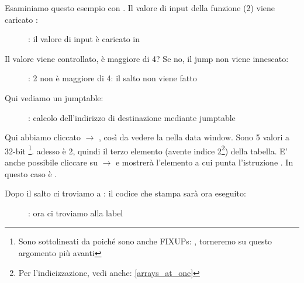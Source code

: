 \clearpage
\mysubparagraph{\olly}
\myindex{\olly}

Esaminiamo questo esempio con \olly.
Il valore di input della funzione (2) viene caricato \EAX: 

\begin{figure}[H]
\centering
{}
\caption{\olly: il valore di input è caricato in \EAX}
\label{fig:switch_lot_olly1}
\end{figure}

\clearpage
Il valore viene controllato, è maggiore di 4?
Se no, il  jump non viene innescato:
\begin{figure}[H]
\centering
{}
\caption{\olly: 2 non è maggiore di 4: il salto non viene fatto}
\label{fig:switch_lot_olly2}
\end{figure}

\clearpage
Qui vediamo un jumptable:

\begin{figure}[H]
\centering
{}
\caption{\olly: calcolo dell'indirizzo di destinazione mediante jumptable}
\label{fig:switch_lot_olly3}
\end{figure}

Qui abbiamo cliccato  $\rightarrow$ , così da vedere la  nella data window.
Sono 5 valori a 32-bit \footnote{Sono sottolineati da \olly poiché
sono anche FIXUPs: , torneremo su questo argomento più avanti}.
\ECX adesso è 2, quindi il terzo elemento (avente indice 2\footnote{Per l'indicizzazione, vedi anche: \ref{arrays_at_one}}) della tabella.
E' anche possibile cliccare su  $\rightarrow$ 
 e \olly mostrerà l'elemento a cui punta l'istruzione \JMP. 
In questo caso è .

\clearpage
Dopo il salto ci troviamo a : il codice che stampa  sarà ora eseguito:

\begin{figure}[H]
\centering
{}
\caption{\olly: ora ci troviamo alla label }
\label{fig:switch_lot_olly4}
\end{figure}
